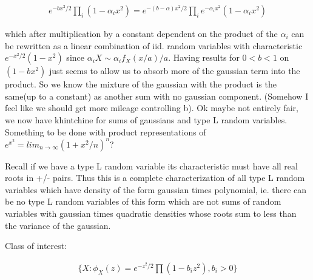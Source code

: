 \documentclass[11pt]{article}
\theoremstyle{remark}
\begin{document}
\begin{align*}
	e^{-bx^2/2}\prod_i (1- \alpha_i x^2) = e^{-(b-\alpha)x^2/2}\prod_i e^{-\alpha_i x^2}(1-\alpha_ix^2)
\end{align*}

which after multiplication by a constant dependent on the product of the $\alpha_i$ can be rewritten as a linear combination of iid. random variables with characteristic $e^{-x^2/2}(1-x^2)$ since $\alpha_i X \sim \alpha_i f_X(x/a)/a$. Having results for $0 < b < 1$ on $(1-bx^2)$ just seems to allow us to absorb more of the gaussian term into the product. So we know the mixture of the gaussian with the product is the same(up to a constant) as another sum with no gaussian component. (Somehow I feel like we should get more mileage controlling b). Ok maybe not entirely fair, we now have khintchine for sums of gaussians and type L random variables. Something to be done with product representations of $e^{x^2} = lim_{n \to \infty} (1+x^2/n)^n$?

Recall if we have a type L random variable its characteristic must have all real roots in +/- pairs. Thus this is a complete characterization of all type L random variables which have density of the form gaussian times polynomial, ie. there can be no type L random variables of this form which are not sums of random variables with gaussian times quadratic densities whose roots sum to less than the variance of the gaussian.

Class of interest:

\begin{align*}
	\{X : \phi_X(z) = e^{-z^2/2}\prod (1-b_iz^2), b_i > 0\}
\end{align*}
\end{document}
